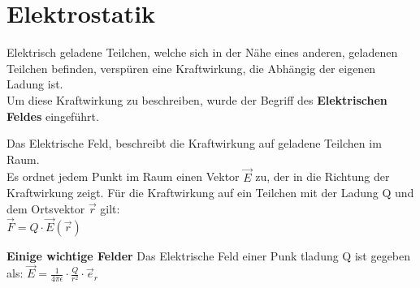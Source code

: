
\section{Elektrostatik}
\label{chap:Style}


Elektrisch geladene Teilchen, welche sich in der Nähe eines anderen, geladenen Teilchen befinden, verspüren eine Kraftwirkung, die Abhängig der eigenen Ladung ist. \\
Um diese Kraftwirkung zu beschreiben, wurde der Begriff des \textbf{Elektrischen Feldes} eingeführt.

\beginip
Das Elektrische Feld, beschreibt die Kraftwirkung auf geladene Teilchen im Raum. \\
Es ordnet jedem Punkt im Raum einen Vektor $\vec{E}$ zu, der in die Richtung der Kraftwirkung zeigt.
Für die Kraftwirkung auf ein Teilchen mit der Ladung Q und dem Ortsvektor $\vec{r}$ gilt: \\
\formulaBegin
$\vec{F} = Q \cdot \vec{E}(\vec{r})$
\formulaEnd
\iend


\textbf{Einige wichtige Felder}
\beginbsp
Das Elektrische Feld einer Punk	tladung Q ist gegeben als:
\formulaBegin
$\vec{E} = \frac{1}{4 \pi \epsilon} \cdot \frac{Q}{r^2}\cdot \vec{e}_r$
\formulaEnd
\begin{center}
\end{center}
\iend




